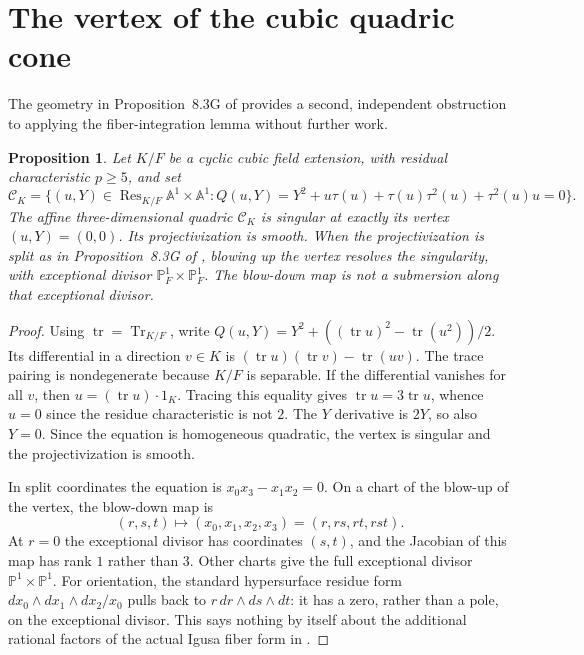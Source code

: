 \documentclass[12pt,letterpaper]{amsart}
\newtheorem{proposition}[lemma]{Proposition}
\begin{document}
\section{The vertex of the cubic quadric cone}\label{sec:cone}
The geometry in Proposition~8.3G of \cite{Jo26} provides a second, independent
obstruction to applying the fiber-integration lemma without further work.

\begin{proposition}\label{prop:vertex}
Let $K/F$ be a cyclic cubic field extension, with residual characteristic
$p\ge5$, and set
\[
 \mathcal C_K=\{(u,Y)\in\operatorname{Res}_{K/F}\mathbb A^1\times\mathbb A^1:
 Q(u,Y)=Y^2+u\tau(u)+\tau(u)\tau^2(u)+\tau^2(u)u=0\}.
\]
The affine three-dimensional quadric $\mathcal C_K$ is singular at exactly
its vertex $(u,Y)=(0,0)$. Its projectivization is smooth. When the
projectivization is split as in Proposition~8.3G of \cite{Jo26}, blowing
up the vertex resolves the singularity, with exceptional divisor
$\mathbb P^1_F\times\mathbb P^1_F$. The blow-down map is not a submersion
along that exceptional divisor.
\end{proposition}

\begin{proof}
Using $\operatorname{tr}=\operatorname{Tr}_{K/F}$, write
$Q(u,Y)=Y^2+((\operatorname{tr}u)^2-\operatorname{tr}(u^2))/2$.
Its differential in a direction $v\in K$ is
$(\operatorname{tr}u)(\operatorname{tr}v)-\operatorname{tr}(uv)$.
The trace pairing is nondegenerate because $K/F$ is separable.
If the differential vanishes for all $v$, then
$u=(\operatorname{tr}u)\cdot1_K$. Tracing this equality gives
$\operatorname{tr}u=3\operatorname{tr}u$, whence $u=0$ since the residue
characteristic is not $2$. The $Y$ derivative is $2Y$, so also $Y=0$.
Since the equation is homogeneous quadratic, the vertex is singular and
the projectivization is smooth.

In split coordinates the equation is $x_0x_3-x_1x_2=0$. On a chart of
the blow-up of the vertex, the blow-down map is
\[
 (r,s,t)\longmapsto (x_0,x_1,x_2,x_3)=(r,rs,rt,rst).
\]
At $r=0$ the exceptional divisor has coordinates $(s,t)$, and the
Jacobian of this map has rank $1$ rather than $3$. Other charts give the
full exceptional divisor $\mathbb P^1\times\mathbb P^1$.
For orientation, the standard hypersurface residue form
$dx_0\wedge dx_1\wedge dx_2/x_0$ pulls back to
$r\,dr\wedge ds\wedge dt$: it has a zero, rather than a pole, on the
exceptional divisor. This says nothing by itself about the additional
rational factors of the actual Igusa fiber form in \cite{Jo26}.
\end{proof}
\end{document}

